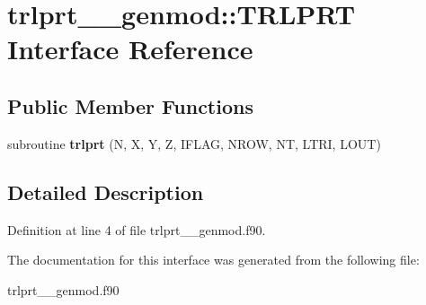 \hypertarget{interfacetrlprt____genmod_1_1_t_r_l_p_r_t}{\section{trlprt\+\_\+\+\_\+genmod\+:\+:T\+R\+L\+P\+R\+T Interface Reference}
\label{interfacetrlprt____genmod_1_1_t_r_l_p_r_t}
}
\subsection*{Public Member Functions}
\begin{DoxyCompactItemize}
\item 
\hypertarget{interfacetrlprt____genmod_1_1_t_r_l_p_r_t_ad984e17783b156f915596dcd2db071a9}{subroutine {\bfseries trlprt} (N, X, Y, Z, I\+F\+L\+A\+G, N\+R\+O\+W, N\+T, L\+T\+R\+I, L\+O\+U\+T)}\label{interfacetrlprt____genmod_1_1_t_r_l_p_r_t_ad984e17783b156f915596dcd2db071a9}

\end{DoxyCompactItemize}


\subsection{Detailed Description}


Definition at line 4 of file trlprt\+\_\+\+\_\+genmod.\+f90.



The documentation for this interface was generated from the following file\+:\begin{DoxyCompactItemize}
\item 
trlprt\+\_\+\+\_\+genmod.\+f90\end{DoxyCompactItemize}
